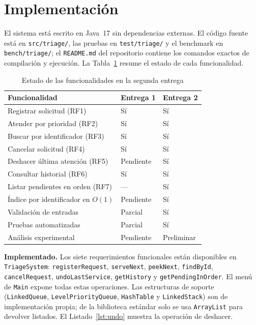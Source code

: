 \section{Implementación}
\label{sec:implementacion}

El sistema está escrito en Java~17 sin dependencias externas. El código
fuente está en \texttt{src/triage/}, las pruebas en \texttt{test/triage/} y
el benchmark en \texttt{bench/triage/}; el \texttt{README.md} del
repositorio contiene los comandos exactos de compilación y ejecución. La
Tabla~\ref{tab:estado} resume el estado de cada funcionalidad.

\begin{table}[t]
  \caption{Estado de las funcionalidades en la segunda entrega}
  \label{tab:estado}
  \centering
  \footnotesize
  \begin{tabular}{p{}p{}p{}}
    \toprule
    Funcionalidad & Entrega 1 & Entrega 2 \\
    \midrule
    Registrar solicitud (RF1) & Sí & Sí \\
    Atender por prioridad (RF2) & Sí & Sí \\
    Buscar por identificador (RF3) & Sí & Sí \\
    Cancelar solicitud (RF4) & Sí & Sí \\
    Deshacer última atención (RF5) & Pendiente & Sí \\
    Consultar historial (RF6) & Sí & Sí \\
    Listar pendientes en orden (RF7) & --- & Sí \\
    Índice por identificador en $O(1)$ & Pendiente & Sí \\
    Validación de entradas & Parcial & Sí \\
    Pruebas automatizadas & Parcial & Sí \\
    Análisis experimental & Pendiente & Preliminar \\
    \bottomrule
  \end{tabular}
\end{table}

\textbf{Implementado.} Los siete requerimientos funcionales están
disponibles en \texttt{TriageSystem}: \texttt{registerRequest},
\texttt{serveNext}, \texttt{peekNext}, \texttt{findById},
\texttt{cancelRequest}, \texttt{undoLastService}, \texttt{getHistory} y
\texttt{getPendingInOrder}. El menú de \texttt{Main} expone todas estas
operaciones. Las estructuras de soporte (\texttt{LinkedQueue},
\texttt{LevelPriorityQueue}, \texttt{HashTable} y \texttt{LinkedStack}) son
de implementación propia; de la biblioteca estándar solo se usa
\texttt{ArrayList} para devolver listados. El Listado~\ref{lst:undo}
muestra la operación de deshacer.

